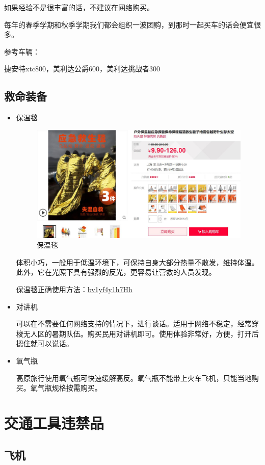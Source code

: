 \documentclass{ctexbook}
\begin{document}
    如果经验不是很丰富的话，不建议在网络购买。

    每年的春季学期和秋季学期我们都会组织一波团购，到那时一起买车的话会便宜很多。

    参考车辆：

    捷安特xtc800，美利达公爵600，美利达挑战者300
\section{救命装备}
\begin{itemize}
    \item 保温毯
\begin{figure}[H]
    \centering
    \includegraphics[width=0.7\linewidth]{fig/保温毯.jpg}
    \caption{保温毯}
\end{figure}

体积小巧，一般用于低温环境下，可保持自身大部分热量不散发，维持体温。此外，它在光照下具有强烈的反光，更容易让营救的人员发现。

保温毯正确使用方法：\href{https://www.bilibili.com/video/BV1yf4y1h7Hh}{bv1yf4y1h7Hh}
\item 对讲机

可以在不需要任何网络支持的情况下，进行谈话。适用于网络不稳定，经常穿梭无人区的暑期队伍。购买民用对讲机即可。使用体验非常好，方便，打开后摁住就可以说话。

\item 氧气瓶

高原旅行使用氧气瓶可快速缓解高反。氧气瓶不能带上火车飞机，只能当地购买。氧气瓶规格按需购买。
\end{itemize}
\chapter{交通工具违禁品}
\section{飞机}
\end{document}
